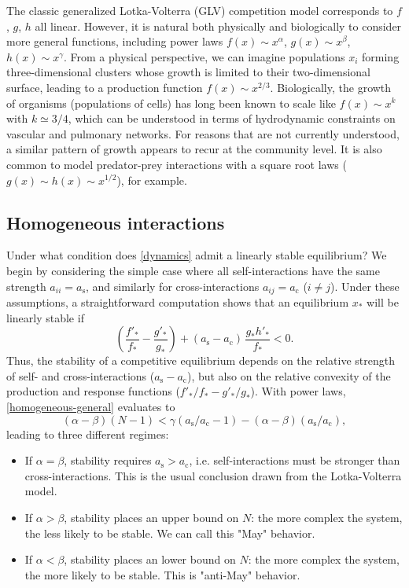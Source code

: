 \documentclass[%
 reprint,
 amsmath,amssymb,
 aps,
]{revtex4-2}
\begin{document}
The classic generalized Lotka-Volterra (GLV) competition model corresponds to $f$, $g$, $h$ all linear. 
However, it is natural both physically and biologically to consider more general functions, including power laws $f(x)\sim x^\alpha$, $g(x)\sim x^\beta$, $h(x) \sim x^\gamma$. 
From a physical perspective, we can imagine populations $x_i$ forming three-dimensional clusters whose growth is limited to their two-dimensional surface, leading to a production function $f(x) \sim x^{2/3}$. 
Biologically, the growth of organisms (populations of cells) has long been known to scale like $f(x) \sim x^k$ with $k\simeq 3/4$, which can be understood in terms of hydrodynamic constraints on vascular and pulmonary networks. 
For reasons that are not currently understood, a similar pattern of growth appears to recur at the community level. 
It is also common to model predator-prey interactions with a square root laws ($g(x) \sim h(x) \sim x^{1/2}$), for example. 

\subsection{Homogeneous interactions}

Under what condition does \eqref{dynamics} admit a linearly stable equilibrium? We begin by considering the simple case where all self-interactions have the same strength $a_{ii} = a_{\textrm{s}}$, and similarly for cross-interactions $a_{ij} = a_{\textrm{c}}$ ($i\neq j$). Under these assumptions, a straightforward computation shows that an equilibrium $x_*$ will be linearly stable if  
\begin{equation}\label{homogeneous-general}
    \left(\frac{f'_*}{f_*} - \frac{g'_*}{g_*}\right) + (a_{\textrm{s}} - a_{\textrm{c}})\,\frac{g_*h'_*}{f_*} < 0. 
\end{equation}
Thus, the stability of a competitive equilibrium depends on the relative strength of self- and cross-interactions ($a_{\textrm{s}} - a_{\textrm{c}}$), but also on the relative convexity of the production and response functions ($f'_*/f_* - g'_*/g_*$). With power laws, \eqref{homogeneous-general} evaluates to 
\begin{equation}
    (\alpha - \beta)(N-1) < \gamma(a_{\textrm{s}}/a_{\textrm{c}}- 1) - (\alpha - \beta)(a_{\textrm{s}}/a_{\textrm{c}}),
\end{equation}
leading to three different regimes:
\begin{itemize}
    \item If $\alpha = \beta$, stability requires $a_{\textrm{s}} > a_{\textrm{c}}$, i.e. self-interactions must be stronger than cross-interactions. This is the usual conclusion drawn from the Lotka-Volterra model. 
    \item If $\alpha > \beta$, stability places an upper bound on $N$: the more complex the system, the less likely to be stable. 
    We can call this "May" behavior.
    \item If $\alpha < \beta$, stability places an lower bound on $N$: the more complex the system, the more likely to be stable. This is "anti-May" behavior.
\end{itemize}
\end{document}
